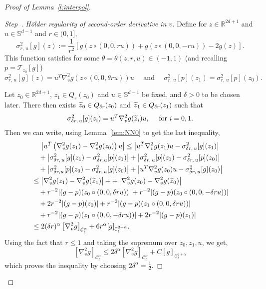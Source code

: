 \documentclass[10pt]{amsart}
\theoremstyle{definition}\newtheorem{defi}[theo]{Definition}\newtheorem{rema}[theo]{Remark}\newtheorem{exam}[theo]{Example}\newtheorem{exem}[theo]{Example}\newtheorem{nota}[theo]{Notation}
\newcommand{\R}{\mathbb{R}}
\newcommand{\bbS}{\mathbb{S}}
\newcommand{\cC}{\mathcal{C}}
\newcommand{\cT}{\mathcal{T}}
\newcounter{stepcount}
\newenvironment{step}[1]{\refstepcounter{stepcount}\begin{proof}[Step~\thestepcount]{\emph{#1}}}{\let\qed\relax\end{proof}}
\let\oldtilde\tilde
\renewcommand*{\tilde}[1]{\mathchoice{\widetilde{#1}}{\widetilde{#1}}{\oldtilde{#1}}{\oldtilde{#1}}}
\begin{document}
\begin{proof}[Proof of Lemma~\ref{l:interpol}]
\begin{step}{H\"older regularity of second-order derivative in $v$.\label{step4}}
Define for $z \in \R^{2d+1}$ and $u \in \bbS^{d-1}$ and $r \in (0,1]$,
\[
\sigma^2 _{r,\,u}[g](z) := \frac{1}{r^2} \left[g(z \circ (0,0,ru)) + g(z \circ (0,0,-ru)) - 2 g(z) \right].
\]
This function satisfies for some $\theta = \theta (z,r,u) \in (-1,1)$ (and recalling $p=\cT_{z_0}[g]$)
\[
\sigma^2_{r,\,u} [g] (z) = u^T \nabla_v ^2 g (z \circ (0,0,\theta r u)) u \quad \text{ and } \quad \sigma_{r,\,u}^2[p](z_1) =
\sigma_{r,\,u}^2[p](z_0).
\]

Let $z_0 \in \R^{2d+1}$, $z_1 \in Q_r (z_0)$ and $u \in \bbS^{d-1}$ be fixed, and $\delta >0$ to be chosen later. There then exists $\tilde z_0 \in Q_{\delta r} (z_0)$ and $\tilde z_1 \in Q_{\delta r} (z_1)$ such that
\[
\sigma_{\delta r,\,u}^2 [g] (z_i) = u^T \nabla_v ^2g (\tilde z_i)u, \quad \text{ for } i=0,1.
\]
Then we can write, using Lemma~\ref{lem:NN0} to get the last inequality,
\begin{multline*}
\left| u^T \left(\nabla_v ^2 g(z_1) - \nabla_v ^2 g(z_0) \right)u\right|
\le \left| u^T \nabla_v ^2 g(z_1) u - \sigma _{\delta r,\,u}^2[g](z_1) \right| \\
\begin{aligned}
&\quad+ \left| \sigma _{\delta r,\,u}^2 [g](z_1) - \sigma _{\delta r,u}^2 [p](z_1) \right| + \left| \sigma_{\delta r,\,u}^2 [p](z_1) - \sigma_{\delta r,\,u}^2[p](z_0) \right| \\
&\quad+\left| \sigma_{\delta r,u}^2[p](z_0) - \sigma_{\delta r,\,u}^2 [g](z_0) \right| + \left| u^T \nabla_v ^2 g(z_0) u -\sigma_{\delta r,\,u}^2 [g](z_0) \right| \\
& \le \left| \nabla_v ^2 g(z_1) - \nabla_v ^2 g (\tilde z_1) \right| + + \left| \nabla_v ^2 g(z_0) -\nabla_v ^2 g (\tilde z_0) \right| \\
& \quad + r^{-2} |(g-p) (z_0 \circ (0,0,\delta r u))| + r^{-2} |(g-p) (z_0 \circ (0,0,-\delta r u))| \\
&\quad + 2 r^{-2} |(g-p) (z_0)| + r^{-2} |(g-p) (z_1 \circ (0,0,\delta r u))| \\
 & \quad + r^{-2} |(g-p) (z_1 \circ (0,0,-\delta r u))| + 2 r^{-2} |(g-p) (z_1)|\\
& \le 2 (\delta r)^\alpha \left[\nabla_v ^2g\right]_{\cC_\ell^\alpha} + 6 r^{\alpha} [g]_{\cC^{2+\alpha}_\ell }.
\end{aligned}
\end{multline*}
Using the fact that $r \le 1$ and taking the supremum over $z_0,z_1, u$, we get,
\[
\left[\nabla_v ^2 g\right]_{\cC_\ell^\alpha} \le 2 \delta ^\alpha \left[\nabla_v ^2 g\right]_{\cC_\ell^\alpha} + C [g]_{\cC^{2+\alpha}_\ell }
\]
which proves the inequality by choosing $2 \delta^\alpha = \frac{1}{2}$.
\end{step}
%


\end{proof}
\end{document}
